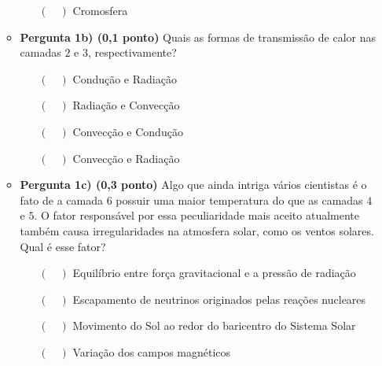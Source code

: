\documentclass[a4paper, 12pt]{article}
\begin{document}
\begin{flushleft}
\begin{itemize}
\begin{itemize}
\begin{multicols}{2}
\begin{itemize}
						\item[$(\quad)$] Cromosfera
					\end{itemize} \end{multicols}
				\item \textbf{Pergunta 1b) (0,1 ponto)} Quais as formas de transmissão de calor nas camadas $2$ e $3$, respectivamente?
					\begin{itemize}
						\item[$(\quad)$] Condução e Radiação
						\item[$(\quad)$] Radiação e Convecção
						\item[$(\quad)$] Convecção e Condução
						\item[$(\quad)$] Convecção e Radiação
					\end{itemize}
				\item \textbf{Pergunta 1c) (0,3 ponto)} Algo que ainda intriga vários cientistas é o fato de a camada $6$ possuir uma maior temperatura do que as camadas $4$ e $5$. O fator responsável por essa peculiaridade mais aceito atualmente também causa irregularidades na atmosfera solar, como os ventos solares. Qual é esse fator?
					\begin{itemize}
						\item[$(\quad)$] Equilíbrio entre força gravitacional e a pressão de radiação
						\item[$(\quad)$] Escapamento de neutrinos originados pelas reações nucleares
						\item[$(\quad)$] Movimento do Sol ao redor do baricentro do Sistema Solar
						\item[$(\quad)$] Variação dos campos magnéticos
					\end{itemize}
			\end{itemize}
			

\end{itemize}
\end{flushleft}
\end{document}
